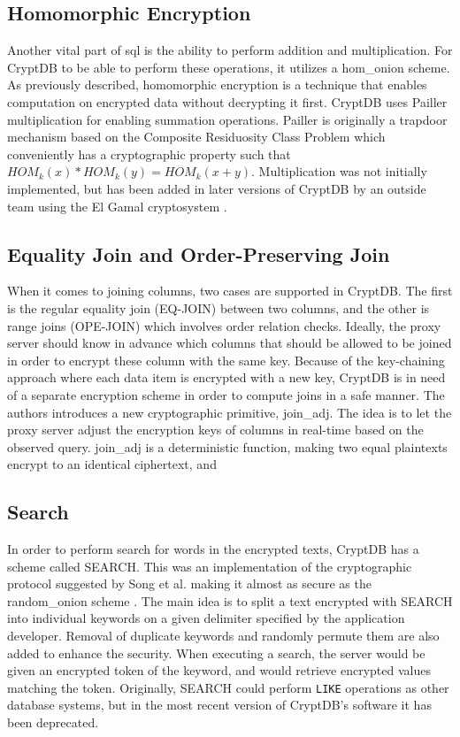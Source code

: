 \subsection{Homomorphic Encryption}
Another vital part of \Gls{sql} is the ability to perform addition and multiplication. For CryptDB to be able to perform these operations, it utilizes a \Gls{hom_onion} scheme. As previously described, homomorphic encryption is a technique that enables computation on encrypted data without decrypting it first. CryptDB uses Pailler multiplication \cite{Paillier} for enabling summation operations. Pailler is originally a trapdoor mechanism based on the Composite Residuosity Class Problem which conveniently has a cryptographic property such that $HOM_k(x) * HOM_k(y) = HOM_k(x + y)$. Multiplication was not initially implemented, but has been added in later versions of CryptDB by an outside team using the El Gamal cryptosystem \cite{cryptdb_guidelines}.


\subsection{Equality Join and Order-Preserving Join}
When it comes to joining columns, two cases are supported in CryptDB. The first is the regular equality join (EQ-JOIN) between two columns, and the other is range joins (OPE-JOIN) which involves order relation checks. Ideally, the proxy server should know in advance which columns that should be allowed to be joined in order to encrypt these column with the same key. Because of the key-chaining approach where each data item is encrypted with a new key, CryptDB is in need of a separate encryption scheme in order to compute joins in a safe manner. The authors \citep{CryptDB_Main_Paper} introduces a new cryptographic primitive, \gls{join_adj}. The idea is to let the proxy server adjust the encryption keys of columns in real-time based on the observed query. \gls{join_adj} is a deterministic function, making two equal plaintexts encrypt to an identical ciphertext, and 


\subsection{Search}
In order to perform search for words in the encrypted texts, CryptDB has a scheme called SEARCH. This was an implementation of the cryptographic protocol suggested by Song et al. making it almost as secure as the \gls{random_onion} scheme \citep{CryptDB_Main_Paper}. The main idea is to split a text encrypted with SEARCH into individual keywords on a given delimiter specified by the application developer. Removal of duplicate keywords and randomly permute them are also added to enhance the security. When executing a search, the server would be given an encrypted token of the keyword, and would retrieve encrypted values matching the token. Originally, SEARCH could perform \texttt{LIKE} operations as other database systems, but in the most recent version of CryptDB's software it has been deprecated. 

